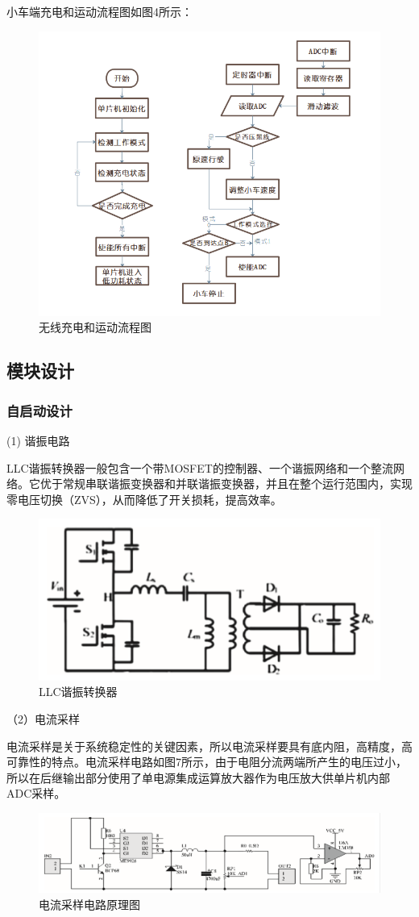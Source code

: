 \documentclass[UTF8]{ctexart}
\begin{document}
小车端充电和运动流程图如图4所示：
\begin{figure}[H]   
	\centering	        \includegraphics[width=0.9\linewidth]{F5.png}
	\caption{无线充电和运动流程图}	  
	\label{fig5} 
\end{figure}

\subsection{模块设计}
\subsubsection{自启动设计}
(1) 谐振电路

LLC谐振转换器一般包含一个带MOSFET的控制器、一个谐振网络和一个整流网络。它优于常规串联谐振变换器和并联谐振变换器，并且在整个运行范围内，实现零电压切换（ZVS），从而降低了开关损耗，提高效率。
\begin{figure}[H]   
	\centering	        \includegraphics[width=0.4\linewidth]{F6.png}
	\caption{LLC谐振转换器}	  
	\label{fig6} 
\end{figure}

（2）电流采样

电流采样是关于系统稳定性的关键因素，所以电流采样要具有底内阻，高精度，高可靠性的特点。电流采样电路\cite{num2}如图7所示，由于电阻分流两端所产生的电压过小，所以在后继输出部分使用了单电源集成运算放大器作为电压放大供单片机内部ADC采样。
\begin{figure}[H]   
	\centering	        \includegraphics[width=0.8\linewidth]{F7.png}
	\caption{电流采样电路原理图}	  
	\label{fig7} 
\end{figure}
\end{document}
